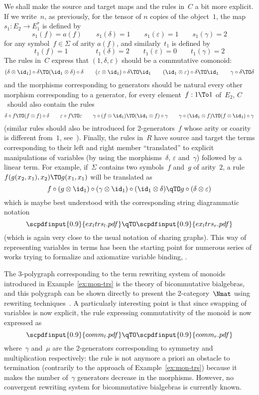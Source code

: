 \documentclass{LMCS}
\newcommand{\strid}[1]{\scpdfinput{0.9}{#1.pdf}}
\begin{document}
We shall make the source and target maps and the rules in~$C$ a bit more
explicit. If we write~$n$, as previously, for the tensor of $n$ copies of the
object~$1$, the map~$s_1:E_2\to E_1^*$ is defined by
\[
s_1(f)=a(f)
\qquad
s_1(\delta)=1
\qquad
s_1(\varepsilon)=1
\qquad
s_1(\gamma)=2
\]
for any symbol~$f\in\Sigma$ of arity $a(f)$, and similarly~$t_1$ is defined by
\[
t_1(f)=1\qquad
\qquad
t_1(\delta)=2
\qquad
t_1(\varepsilon)=0
\qquad
t_1(\gamma)=2
\]
The rules in~$C$ express that $(1,\delta,\varepsilon)$ should be a commutative
comonoid:
\[
(\delta\otimes\id_1)\circ\delta\TO (\id_1\otimes\delta)\circ\delta
\qquad
(\varepsilon\otimes\id_1)\circ\delta\TO\id_1
\qquad
(\id_1\otimes\varepsilon)\circ\delta\TO\id_1
\qquad
\gamma\circ\delta\TO\delta
\]
and the morphisms corresponding to generators should be natural \wrt every other
morphism corresponding to a generator, \eg for every element~$f:1\To 1$
of~$E_2$, $C$~should also contain the rules
\[
\delta\circ f\TO(f\otimes f)\circ\delta
\qquad
\varepsilon\circ f\TO\varepsilon
\qquad
\gamma\circ(f\otimes\id_1)\TO(\id_1\otimes f)\circ\gamma
\qquad
\gamma\circ(\id_1\otimes f)\TO(f\otimes\id_1)\circ\gamma
\]
(similar rules should also be introduced for 2-generators~$f$ whose arity or
coarity is different from~$1$,
see~\cite{burroni:higher-word}). Finally, the rules in~$R$ have source and
target the terms corresponding to their left and right member ``translated'' to
explicit manipulations of variables (by using the morphisms~$\delta$, $\varepsilon$
and~$\gamma$) followed by a linear term. For example, if~$\Sigma$ contains two
symbols~$f$ and~$g$ of arity~$2$, a rule $f(g(x_2,x_1),x_2)\TO g(x_1,x_1)$ will
be translated as
\[
f\circ(g\otimes\id_1)\circ(\gamma\otimes\id_1)\circ(\id_1\otimes\delta)\qTO
g\circ(\delta\otimes\varepsilon)
\]
which is maybe best understood with the corresponding string diagrammatic
notation
\[
\strid{ex_ltrs_l}
\qTO
\strid{ex_ltrs_r}
\]
(which is again very close to the usual notation of sharing graphs). This way of
representing variables in terms has been the starting point for numerous series
of works trying to formalize and axiomatize variable binding, \eg
\cite{fiore-plotkin-turi:as-vb}.

\begin{exa}
  \label{ex:mon-poly}
  The 3-polygraph corresponding to the term rewriting system of monoids
  introduced in Example~\ref{ex:mon-trs} is the theory of bicommutative
  bialgebras, and this polygraph can be shown directly to present the
  2-category~$\Nmat$ using rewriting techniques~\cite{lafont:boolean-circuits,
    mimram:phd, mimram:first-order-causality}. A particularly interesting point
  is that since swapping of variables is now explicit, the rule expressing
  commutativity of the monoid is now expressed as
  \[
  \strid{comm_l}
  \qTO
  \strid{comm_r}
  \]
  where~$\gamma$ and~$\mu$ are the 2-generators corresponding to symmetry and
  multiplication respectively: the rule is not anymore a priori an obstacle to
  termination (contrarily to the approach of Example~\ref{ex:mon-trs}) because
  it makes the number of~$\gamma$ generators decrease in the morphisms. However,
  no convergent rewriting system for bicommutative bialgebras is currently
  known.
\end{exa}
\end{document}
